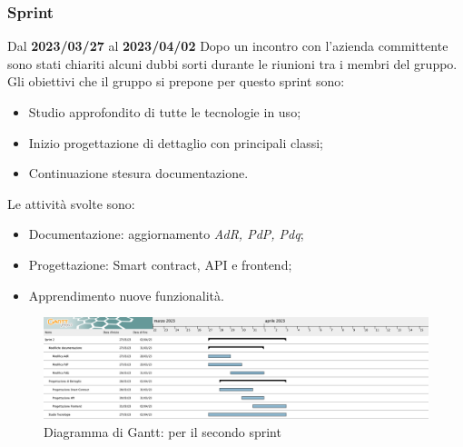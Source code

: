 \subsubsection{ Sprint}
Dal \textbf{2023/03/27} al \textbf{2023/04/02}
\newline
Dopo un incontro con l'azienda committente sono stati chiariti alcuni dubbi sorti durante le riunioni tra i membri del gruppo.
\newline
Gli obiettivi che il gruppo si prepone per questo sprint sono:
\begin{itemize}
    \item Studio approfondito di tutte le tecnologie in uso;
    \item Inizio progettazione di dettaglio con principali classi;
    \item Continuazione stesura documentazione.
\end{itemize}
Le attività svolte sono:
\begin{itemize}
    \item Documentazione: aggiornamento \textit{AdR, PdP, Pdq};
    \item Progettazione: Smart contract, API e frontend;
    \item Apprendimento nuove funzionalità.

\end{itemize}
\begin{figure}[H]
    \centering
    \includegraphics[scale=0.32]{src/img/Sprint 2.png}
    \caption{Diagramma di Gantt: per il secondo sprint}
\end{figure}
